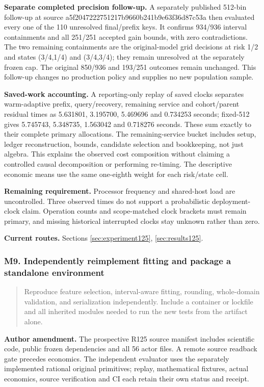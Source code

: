 \noindent\textbf{Separate completed precision follow-up.} A separately published 512-bin follow-up at source a5f2047222751217b9660b241b9e63f36d87c53a then evaluated every one of the 110 unresolved final/prefix keys. It confirms 934/936 interval containments and all 251/251 accepted gain bounds, with zero contradictions. The two remaining containments are the original-model grid decisions at risk 1/2 and states (3/4,1/4) and (3/4,3/4); they remain unresolved at the separately frozen cap. The original 850/936 and 193/251 outcomes remain unchanged. This follow-up changes no production policy and supplies no new population sample.

\noindent\textbf{Saved-work accounting.} A reporting-only replay of saved clocks separates warm-adaptive prefix, query/recovery, remaining service and cohort/parent residual times as 5.631801, 3.195700, 5.469696 and 0.734253 seconds; fixed-512 gives 5.745743, 5.348735, 1.563042 and 0.718276 seconds. These sum exactly to their complete primary allocations. The remaining-service bucket includes setup, ledger reconstruction, bounds, candidate selection and bookkeeping, not just algebra. This explains the observed cost composition without claiming a controlled causal decomposition or performing re-timing. The descriptive economic means use the same one-eighth weight for each risk/state cell.

\noindent\textbf{Remaining requirement.} Processor frequency and shared-host load are uncontrolled. Three observed times do not support a probabilistic deployment-clock claim. Operation counts and scope-matched clock brackets must remain primary, and missing historical interrupted clocks stay unknown rather than zero.

\noindent\textbf{Current routes.} Sections \ref{sec:experiment125}, \ref{sec:results125}.

\subsubsection{M9. Independently reimplement fitting and package a standalone environment}

\begin{quote}\small
Reproduce feature selection, interval-aware fitting, rounding, whole-domain validation, and serialization independently. Include a container or lockfile and all inherited modules needed to run the new tests from the artifact alone.
\end{quote}

\noindent\textbf{Author amendment.} The prospective R125 source manifest includes scientific code, public frozen dependencies and all 56 actor files. A remote source readback gate precedes economics. The independent evaluator uses the separately implemented rational original primitives; replay, mathematical fixtures, actual economics, source verification and CI each retain their own status and receipt.


